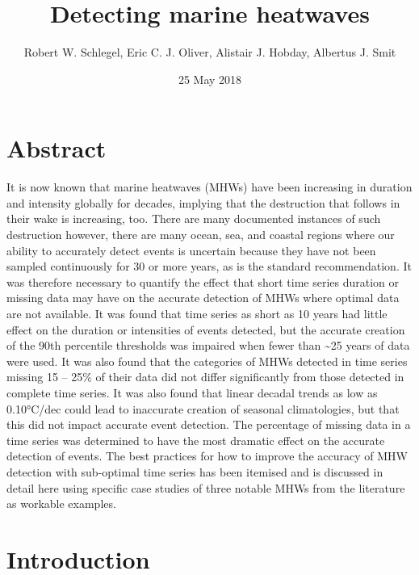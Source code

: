 \documentclass[]{article}
\title{Detecting marine heatwaves}
\author{Robert W. Schlegel, Eric C. J. Oliver, Alistair J. Hobday, Albertus J.
Smit}
\date{25 May 2018}
\begin{document}
\maketitle

\section{Abstract}\label{abstract}

It is now known that marine heatwaves (MHWs) have been increasing in
duration and intensity globally for decades, implying that the
destruction that follows in their wake is increasing, too. There are
many documented instances of such destruction however, there are many
ocean, sea, and coastal regions where our ability to accurately detect
events is uncertain because they have not been sampled continuously for
30 or more years, as is the standard recommendation. It was therefore
necessary to quantify the effect that short time series duration or
missing data may have on the accurate detection of MHWs where optimal
data are not available. It was found that time series as short as 10
years had little effect on the duration or intensities of events
detected, but the accurate creation of the 90th percentile thresholds
was impaired when fewer than \textasciitilde{}25 years of data were
used. It was also found that the categories of MHWs detected in time
series missing 15 -- 25\% of their data did not differ significantly
from those detected in complete time series. It was also found that
linear decadal trends as low as 0.10°C/dec could lead to inaccurate
creation of seasonal climatologies, but that this did not impact
accurate event detection. The percentage of missing data in a time
series was determined to have the most dramatic effect on the accurate
detection of events. The best practices for how to improve the accuracy
of MHW detection with sub-optimal time series has been itemised and is
discussed in detail here using specific case studies of three notable
MHWs from the literature as workable examples.

\section{Introduction}\label{introduction}
\end{document}
